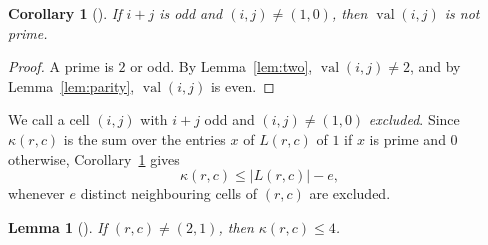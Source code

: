 \documentclass[11pt]{amsart}
\theoremstyle{plain}
\newtheorem{lemma}[theorem]{Lemma}
\newtheorem{corollary}[theorem]{Corollary}
\theoremstyle{definition}
\newcommand{\val}{\operatorname{val}}
\begin{document}
\begin{corollary}[]\label{cor:np}
If $i+j$ is odd and $(i,j)\ne(1,0)$, then $\val(i,j)$ is not prime.
\end{corollary}

\begin{proof}
A prime is $2$ or odd.
By Lemma~\ref{lem:two}, $\val(i,j)\ne2$, and by Lemma~\ref{lem:parity}, $\val(i,j)$ is even.
\end{proof}

We call a cell $(i,j)$ with $i+j$ odd and $(i,j)\ne(1,0)$ \emph{excluded}.
Since $\kappa(r,c)$ is the sum over the entries $x$ of $L(r,c)$ of $1$ if $x$ is prime and $0$ otherwise, Corollary~\ref{cor:np} gives
\begin{equation}\label{eq:count}
  \kappa(r,c)\le |L(r,c)|-e,
\end{equation}
whenever $e$ distinct neighbouring cells of $(r,c)$ are excluded.

\begin{lemma}[]\label{lem:count}
If $(r,c)\ne(2,1)$, then $\kappa(r,c)\le4$.
\end{lemma}
\end{document}
